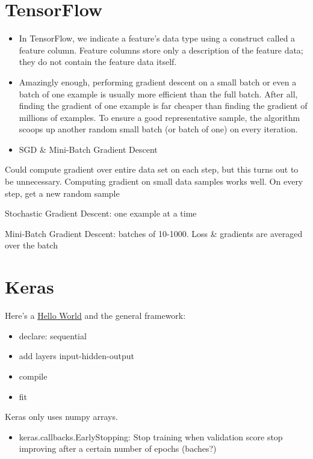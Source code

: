 \documentclass[]{book}
\providecommand{\tightlist}{%
  \setlength{\itemsep}{0pt}\setlength{\parskip}{0pt}}
\theoremstyle{definition}
\theoremstyle{definition}
\theoremstyle{definition}
\theoremstyle{remark}
\begin{document}
\section{TensorFlow}\label{tensorflow}

\begin{itemize}
\item
  In TensorFlow, we indicate a feature's data type using a construct
  called a feature column. Feature columns store only a description of
  the feature data; they do not contain the feature data itself.
\item
  Amazingly enough, performing gradient descent on a small batch or even
  a batch of one example is usually more efficient than the full batch.
  After all, finding the gradient of one example is far cheaper than
  finding the gradient of millions of examples. To ensure a good
  representative sample, the algorithm scoops up another random small
  batch (or batch of one) on every iteration.
\item
  SGD \& Mini-Batch Gradient Descent
\end{itemize}

Could compute gradient over entire data set on each step, but this turns
out to be unnecessary. Computing gradient on small data samples works
well. On every step, get a new random sample

Stochastic Gradient Descent: one example at a time

Mini-Batch Gradient Descent: batches of 10-1000. Loss \& gradients are
averaged over the batch

\section{Keras}\label{keras}

Here's a
\href{https://github.com/fastforwardlabs/keras-hello-world/blob/master/kerashelloworld.ipynb}{Hello
World} and the general framework:

\begin{itemize}
\item
  declare: sequential
\item
  add layers input-hidden-output
\item
  compile
\item
  fit
\end{itemize}

Keras only uses numpy arrays.

\begin{itemize}
\tightlist
\item
  keras.callbacks.EarlyStopping: Stop training when validation score
  stop improving after a certain number of epochs (baches?)
\end{itemize}
\end{document}
